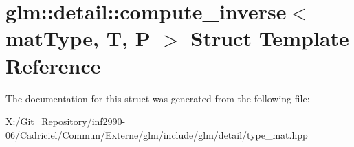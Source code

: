 \hypertarget{structglm_1_1detail_1_1compute__inverse}{\section{glm\-:\-:detail\-:\-:compute\-\_\-inverse$<$ mat\-Type, T, P $>$ Struct Template Reference}
\label{structglm_1_1detail_1_1compute__inverse}
}


The documentation for this struct was generated from the following file\-:\begin{DoxyCompactItemize}
\item 
X\-:/\-Git\-\_\-\-Repository/inf2990-\/06/\-Cadriciel/\-Commun/\-Externe/glm/include/glm/detail/type\-\_\-mat.\-hpp\end{DoxyCompactItemize}
